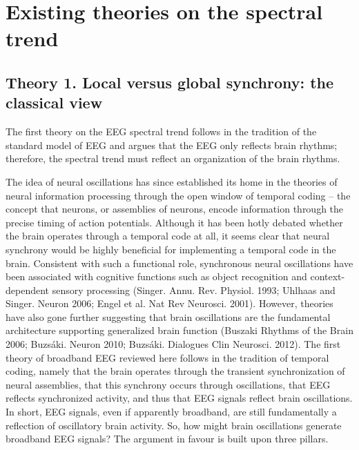 \section{Existing theories on the spectral trend} \label{sec:theories}

\subsection{Theory 1. Local versus global synchrony: the classical view} \label{sec:all_oscillations}
The first theory on the EEG spectral trend follows in the tradition of the standard model of EEG and argues that the EEG only reflects brain rhythms; therefore, the spectral trend must reflect an organization of the brain rhythms. 

The idea of neural oscillations has since established its home in the theories of neural information processing through the open window of temporal coding – the concept that neurons, or assemblies of neurons, encode information through the precise timing of action potentials. Although it has been hotly debated whether the brain operates through a temporal code at all, it seems clear that neural synchrony would be highly beneficial for implementing a temporal code in the brain. Consistent with such a functional role, synchronous neural oscillations have been associated with cognitive functions such as object recognition and context-dependent sensory processing (Singer. Annu. Rev. Physiol. 1993; Uhlhaas and Singer. Neuron 2006; Engel et al. Nat Rev Neurosci. 2001). However, theories have also gone further suggesting that brain oscillations are the fundamental architecture supporting generalized brain function (Buszaki Rhythms of the Brain 2006; Buzsáki. Neuron 2010; Buzsáki. Dialogues Clin Neurosci. 2012). The first theory of broadband EEG reviewed here follows in the tradition of temporal coding, namely that the brain operates through the transient synchronization of neural assemblies, that this synchrony occurs through oscillations, that EEG reflects synchronized activity, and thus that EEG signals reflect brain oscillations. In short, EEG signals, even if apparently broadband, are still fundamentally a reflection of oscillatory brain activity. So, how might brain oscillations generate broadband EEG signals? The argument in favour is built upon three pillars.

